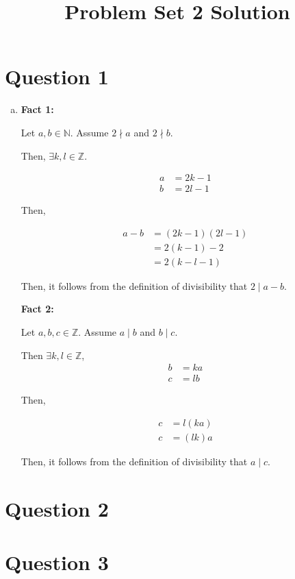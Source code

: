 \documentclass[12pt]{article}
\begin{document}
\title{Problem Set 2 Solution}
\maketitle

\section*{Question 1}
\begin{enumerate}[a.]
    \item

    \textbf{Fact 1:}

    \bigskip

    Let $a,b \in \mathbb{N}$. Assume $2 \nmid a$ and $2 \nmid b$.

    \bigskip

    Then, $\exists k,l \in \mathbb{Z}$.

    \begin{align}
        a &= 2k - 1\\
        b &= 2l - 1
    \end{align}

    \bigskip

    Then,

    \begin{align}
        a - b &= (2k-1)(2l-1)\\
        &= 2(k-1)-2\\
        &= 2(k-l-1)
    \end{align}

    \bigskip

    Then, it follows from the definition of divisibility that $2 \mid a-b$.

    \textbf{Fact 2:}

    \bigskip

    Let $a,b,c \in \mathbb{Z}$. Assume $a \mid b$ and $b \mid c$.

    \bigskip

    Then $\exists k,l \in \mathbb{Z}$,
    \setcounter{equation}{0}
    \begin{align}
        b &= ka\\
        c &= lb
    \end{align}

    \bigskip

    Then,

    \begin{align}
        c &= l(ka)\\
        c &= (lk)a
    \end{align}

    Then, it follows from the definition of divisibility that $a \mid c$.

\end{enumerate}

\section*{Question 2}

\section*{Question 3}
\end{document}
